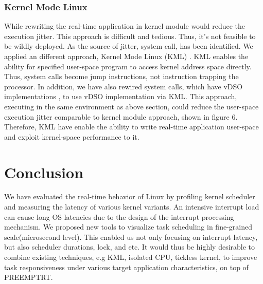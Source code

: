 \documentclass[conference]{IEEEtran}
\begin{document}
\subsubsection{Kernel Mode Linux}
    
    While rewriting the real-time application in kernel module would reduce the execution jitter. This approach is
    difficult and tedious. Thus, it's not feasible to be wildly deployed. As the source of jitter, system call, has been
    identified. We applied an different approach, Kernel Mode Linux (KML) \cite{KML} \cite{KMLConf}. KML enables the
    ability for specified user-space program to access kernel address space directly. Thus, system calls become jump
    instructions, not instruction trapping the processor. In addition, we have also rewired system calls, which have
    vDSO implementations \cite{vDSO}, to use vDSO implementation via KML. This approach, executing in the same
    environment as above section, could reduce the user-space execution jitter comparable to kernel module approach,
    shown in figure 6. Therefore, KML have enable the ability to write real-time application user-space and exploit
    kernel-space performance to it.
   
\section{Conclusion}

    We have evaluated the real-time behavior of Linux by profiling kernel scheduler and measuring the latency of various
    kernel variants. An intensive interrupt load can cause long OS latencies due to the design of the interrupt
    processing mechanism. We proposed new tools to visualize task scheduling in fine-grained scale(microsecond level).
    This enabled us not only focusing on interrupt latency, but also scheduler durations, lock, and etc. It would thus
    be highly desirable to combine existing techniques, e.g KML, isolated CPU, tickless kernel, to improve task
    responsiveness under various target application characteristics, on top of PREEMPT\textunderscore RT.



\end{document}
